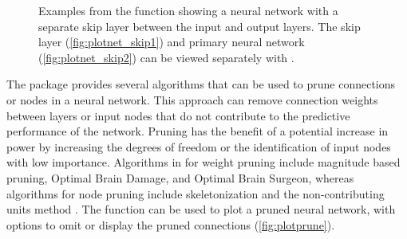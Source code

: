 \documentclass[article,shortnames]{jss}\usepackage[]{graphicx}\usepackage[]{color}
\newenvironment{knitrout}{}{} %
\begin{document}
\begin{knitrout}
\begin{figure}[!ht]
{}

\caption{Examples from the  function showing a neural network with a separate skip layer between the input and output layers.  The skip layer (\ref{fig:plotnet_skip1}) and primary neural network (\ref{fig:plotnet_skip2}) can be viewed separately with .}\label{fig:plotnet_skip}
\end{figure}


\end{knitrout}

The  package provides several algorithms that can be used to prune connections or nodes in a neural network.  This approach can remove connection weights between layers or input nodes that do not contribute to the predictive performance of the network.  Pruning has the benefit of a potential increase in power by increasing the degrees of freedom or the identification of input nodes with low importance.  Algorithms in  for weight pruning include magnitude based pruning, Optimal Brain Damage, and Optimal Brain Surgeon, whereas algorithms for node pruning include skeletonization and the non-contributing units method \citep{Zell98}.  The  function can be used to plot a pruned neural network, with options to omit or display the pruned connections (\cref{fig:plotprune}).  
\end{document}
